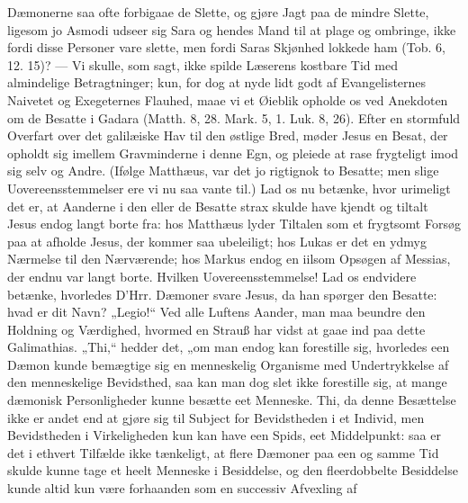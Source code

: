 \documentclass[12pt,a4paper]{book}
\begin{document}
Dæmonerne saa ofte forbigaae de
Slette, og gjøre Jagt paa de mindre Slette, ligesom jo Asmodi udseer sig Sara og hendes
Mand til at plage og ombringe, ikke fordi disse Personer vare slette, men fordi Saras
Skjønhed lokkede ham (Tob. 6, 12. 15)? --- Vi skulle, som sagt, ikke spilde Læserens
kostbare Tid med almindelige Betragtninger; kun, for dog at nyde lidt godt af
Evangelisternes Naivetet og Exegeternes Flauhed, maae vi et Øieblik opholde os ved
Anekdoten om de Besatte i Gadara (Matth. 8, 28. Mark. 5, 1. Luk. 8, 26). Efter en
stormfuld Overfart over det galilæiske Hav til den østlige Bred, møder Jesus en Besat, der
opholdt sig imellem Gravminderne i denne Egn, og pleiede at rase frygteligt imod sig selv
og Andre. (Ifølge Matthæus, var det jo rigtignok to Besatte; men slige
Uovereensstemmelser ere vi nu saa vante til.) Lad os nu betænke, hvor urimeligt det er, at
Aanderne i den eller de Besatte strax skulde have kjendt og tiltalt Jesus endog langt
borte fra: hos Matthæus lyder Tiltalen som et frygtsomt Forsøg paa at afholde Jesus, der
kommer saa ubeleiligt; hos Lukas er det en ydmyg Nærmelse til den Nærværende; hos Markus
endog en iilsom Opsøgen af Messias, der endnu var langt borte. Hvilken Uovereensstemmelse!
Lad os endvidere betænke, hvorledes D'Hrr. Dæmoner svare Jesus, da han spørger den
Besatte: hvad er dit Navn? „Legio!“ Ved alle Luftens Aander, man maa beundre den Holdning
og Værdighed, hvormed en Strauß har vidst at gaae ind paa dette Galimathias. „Thi,“ hedder
det, „om man endog kan forestille sig, hvorledes een Dæmon kunde bemægtige sig en
menneskelig Organisme med Undertrykkelse af den menneskelige Bevidsthed, saa kan man dog
slet ikke forestille sig, at mange dæmonisk Personligheder kunne besætte eet Menneske.
Thi, da denne Besættelse ikke er andet end at gjøre sig til Subject for Bevidstheden i et
Individ, men Bevidstheden i Virkeligheden kun kan have
een Spids, eet Middelpunkt: saa er det i ethvert Tilfælde ikke tænkeligt, at flere
Dæmoner paa een og samme Tid skulde kunne tage et heelt Menneske i Besiddelse, og den
fleerdobbelte Besiddelse kunde altid kun være forhaanden som en successiv Afvexling af
\end{document}

